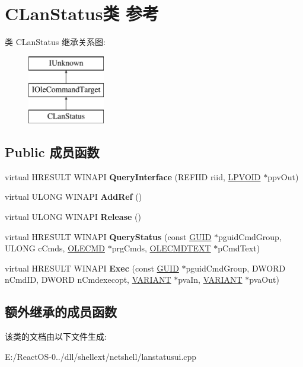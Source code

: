 \hypertarget{class_c_lan_status}{}\section{C\+Lan\+Status类 参考}
\label{class_c_lan_status}
类 C\+Lan\+Status 继承关系图\+:\begin{figure}[H]
\begin{center}
\leavevmode
\includegraphics[height=3.000000cm]{class_c_lan_status}
\end{center}
\end{figure}
\subsection*{Public 成员函数}
\begin{DoxyCompactItemize}
\item 
\mbox{\label{class_c_lan_status_a366b4c78ff2fd29116ec2b83d79f0270}} 
virtual H\+R\+E\+S\+U\+LT W\+I\+N\+A\+PI {\bfseries Query\+Interface} (R\+E\+F\+I\+ID riid, \hyperlink{interfacevoid}{L\+P\+V\+O\+ID} $\ast$ppv\+Out)
\item 
\mbox{\label{class_c_lan_status_a9bd94ed64a790864a3582b055cf86bfb}} 
virtual U\+L\+O\+NG W\+I\+N\+A\+PI {\bfseries Add\+Ref} ()
\item 
\mbox{\label{class_c_lan_status_a2bc413c3a6ca43cd78df66bef408b469}} 
virtual U\+L\+O\+NG W\+I\+N\+A\+PI {\bfseries Release} ()
\item 
\mbox{\label{class_c_lan_status_a4f8b6acdd073046f7d2ef4f6f06183b7}} 
virtual H\+R\+E\+S\+U\+LT W\+I\+N\+A\+PI {\bfseries Query\+Status} (const \hyperlink{interface_g_u_i_d}{G\+U\+ID} $\ast$pguid\+Cmd\+Group, U\+L\+O\+NG c\+Cmds, \hyperlink{struct_i_ole_command_target_1_1__tag_o_l_e_c_m_d}{O\+L\+E\+C\+MD} $\ast$prg\+Cmds, \hyperlink{struct_i_ole_command_target_1_1__tag_o_l_e_c_m_d_t_e_x_t}{O\+L\+E\+C\+M\+D\+T\+E\+XT} $\ast$p\+Cmd\+Text)
\item 
\mbox{\label{class_c_lan_status_a0c738bf83dafb3b253fcc88a561de913}} 
virtual H\+R\+E\+S\+U\+LT W\+I\+N\+A\+PI {\bfseries Exec} (const \hyperlink{interface_g_u_i_d}{G\+U\+ID} $\ast$pguid\+Cmd\+Group, D\+W\+O\+RD n\+Cmd\+ID, D\+W\+O\+RD n\+Cmdexecopt, \hyperlink{structtag_v_a_r_i_a_n_t}{V\+A\+R\+I\+A\+NT} $\ast$pva\+In, \hyperlink{structtag_v_a_r_i_a_n_t}{V\+A\+R\+I\+A\+NT} $\ast$pva\+Out)
\end{DoxyCompactItemize}
\subsection*{额外继承的成员函数}


该类的文档由以下文件生成\+:\begin{DoxyCompactItemize}
\item 
E\+:/\+React\+O\+S-\/0../dll/shellext/netshell/lanstatusui.\+cpp\end{DoxyCompactItemize}

